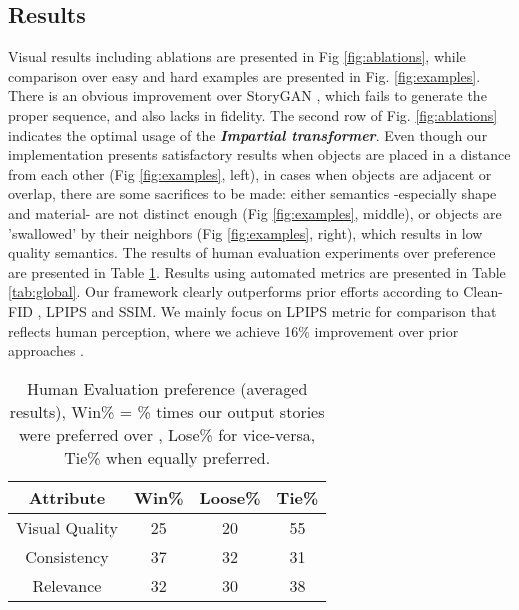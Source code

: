 \documentclass{article}
\begin{document}
\subsection{Results}
Visual results including ablations are presented in Fig \ref{fig:ablations}, while comparison over easy and hard examples are presented in Fig. \ref{fig:examples}. There is an obvious improvement over StoryGAN \cite{storygan}, which fails to generate the proper sequence, and also lacks in fidelity. The second row of Fig. \ref{fig:ablations} indicates the optimal usage of the \textbf{\textit{Impartial transformer}}.
Even though our implementation presents satisfactory results when objects are placed in a distance from each other (Fig \ref{fig:examples}, left), in cases when objects are adjacent or overlap, there are some sacrifices to be made: either semantics -especially shape and material- are not distinct enough (Fig \ref{fig:examples}, middle), or objects are 'swallowed' by their neighbors (Fig \ref{fig:examples}, right), which results in low quality semantics. 
The results of human evaluation experiments over preference are presented in Table \ref{tab:human_eval}. Results using automated metrics are presented in Table \ref{tab:global}. Our framework clearly outperforms prior efforts \cite{storygan, Maharana2021ImprovingGA, Maharana2021IntegratingVL} according to Clean-FID \cite{cleanfid}, LPIPS \cite{lpips} and SSIM. We mainly focus on LPIPS metric for comparison that reflects human perception, where we achieve 16\% improvement over prior approaches \cite{storygan, Maharana2021ImprovingGA, Maharana2021IntegratingVL}.

\begin{table}[htp]
\centering
\caption{Human Evaluation preference (averaged results), Win\% = \% times our output stories were preferred
over \cite{storygan}, Lose\% for vice-versa, Tie\% when equally preferred.}
\label{tab:human_eval}
  \begin{tabular}{cccc}
    \toprule
    Attribute & Win\% & Loose\% & Tie\%\\
    \midrule
    Visual Quality & 25& 20 & 55\\
    Consistency & 37& 32& 31 \\
    Relevance  & 32& 30& 38\\
  \bottomrule
\end{tabular}
\end{table}
\end{document}
